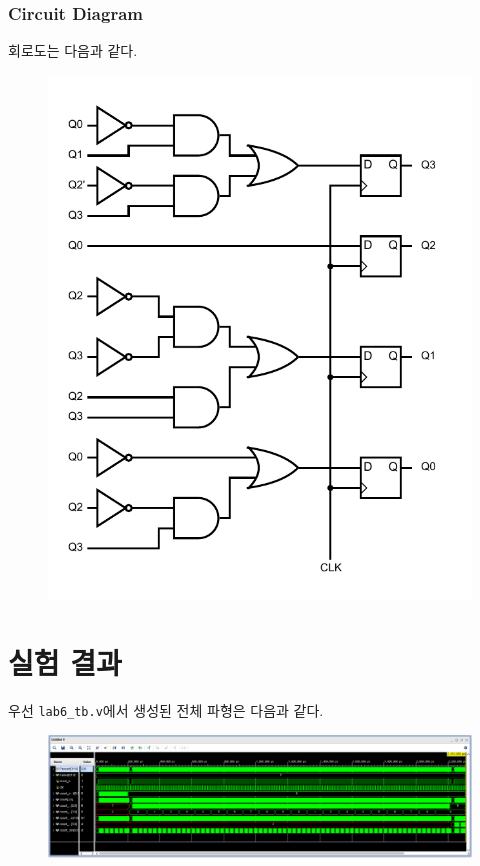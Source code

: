 \documentclass{scrartcl}
\begin{document}
\subsubsection{Circuit Diagram}
회로도는 다음과 같다.
\begin{figure}[H]
  \centering
  \includegraphics[width=0.6\linewidth]{lab6_3_circuit.pdf}
\end{figure}

\section{실험 결과}
우선 \texttt{lab6\_tb.v}에서 생성된 전체 파형은 다음과 같다.
\begin{figure}[H]
  \centering
  \includegraphics[width=0.9\linewidth]{lab6_waveform.png}
\end{figure}
\end{document}
